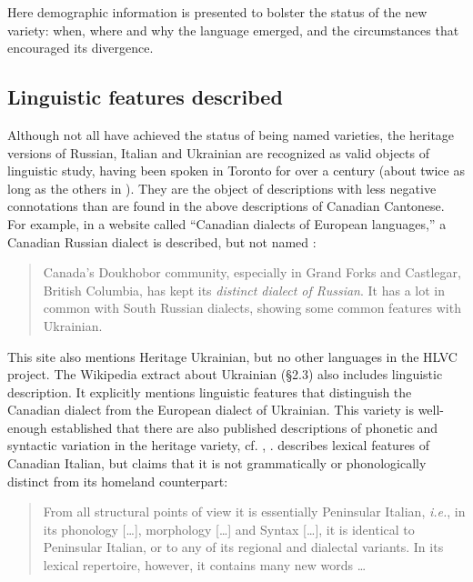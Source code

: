 \documentclass[output=paper]{LSP/langsci}
\begin{document}
Here demographic information is presented to bolster the status of the new variety: when, where and why the language emerged, and the circumstances that encouraged its divergence. 

\subsection{Linguistic features described}

Although not all have achieved the status of being named varieties, the heritage versions of Russian, Italian and Ukrainian are recognized as valid objects of linguistic study, having been spoken in Toronto for over a century (about twice as long as the others in ). They are the object of descriptions with less negative connotations than are found in the above descriptions of Canadian Cantonese. For example, in a website called “Canadian dialects of European languages,” a Canadian Russian dialect is described, but not named \citep{language_factory_canadian_2013}:

\begin{quote}
Canada’s Doukhobor community, especially in Grand Forks and Castlegar, British Columbia, has kept its \textit{distinct dialect of Russian}. It has a lot in common with South Russian dialects, showing some common features with Ukrainian. 
\end{quote}

This site also mentions Heritage Ukrainian, but no other languages in the HLVC project. The Wikipedia extract about Ukrainian (§2.3) also includes linguistic description. It explicitly mentions linguistic features that distinguish the Canadian dialect from the European dialect of Ukrainian. This variety is well-enough established that there are also published descriptions of phonetic and syntactic variation in the heritage variety, cf. \citet{hudyma_ukrainian_2011}, \citet{struk_between_2000}. \citet{danesi_canadian_1983,danesi_canadian_1984} describes lexical features of Canadian Italian, but claims that it is not grammatically or phonologically distinct from its homeland counterpart: 

\begin{quote}
From all structural points of view it is essentially Peninsular Italian, \textit{i.e.}, in its phonology […], morphology […] and Syntax […], it is identical to Peninsular Italian, or to any of its regional and dialectal variants. In its lexical repertoire, however, it contains many new words … 
\end{quote}
\end{document}
